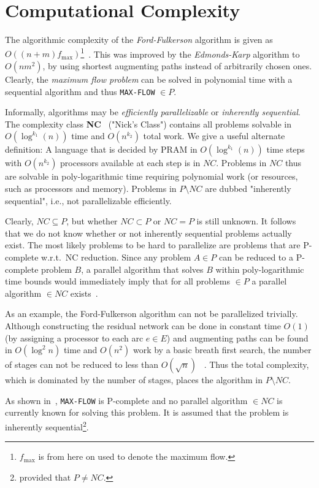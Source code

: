 \documentclass[a4paper,10pt, twocolumn]{article}
\begin{document}
\section{Computational Complexity}
\label{sec:cc}
The algorithmic complexity of the \emph{Ford-Fulkerson} algorithm is given as $O((n+m)f_{\mathrm{max}})$\footnote{$f_{\mathrm{max}}$ is from here on used to denote the maximum flow.}~\cite{ahuja93,papa95}. This was improved by the \emph{Edmonds-Karp} algorithm to $O(nm^2)$, by using shortest augmenting paths instead of arbitrarily chosen ones. Clearly, the \emph{maximum flow problem} can be solved in polynomial time with a sequential algorithm and thus \lstinline|MAX-FLOW| $\in P$.

Informally, algorithms may be \emph{efficiently parallelizable} or \emph{inherently sequential}. The complexity class \textbf{NC}~\cite{papa95} ("Nick's Class") contains all problems solvable in $O(\log^{k_1}(n))$ time and $O(n^{k_2})$ total work. We give a useful alternate definition:  A language that is decided by PRAM in $O(\log^{k_1}(n))$ time steps with $O(n^{k_2})$ processors available at each step is in $NC$. Problems in $NC$ thus are solvable  in poly-logarithmic time requiring polynomial work (or resources, such as processors and memory). Problems in $P \setminus NC$ are dubbed "inherently sequential", i.e., not parallelizable efficiently. 

Clearly, $NC \subseteq P$, but whether $NC \subset P$ or $NC = P$ is still unknown. It follows that we do not know whether or not inherently sequential problems actually exist. The most likely problems to be hard to parallelize are problems that are P-complete w.r.t.\ NC reduction. Since any problem $A \in P$ can be reduced to a P-complete problem $B$, a parallel algorithm that solves $B$ within poly-logarithmic time bounds would immediately imply that for all problems $\in P$ a parallel algorithm $\in NC$ exists~\cite{papa95}.

As an example, the Ford-Fulkerson algorithm can not be parallelized trivially. Although constructing the residual network can be done in constant time $O(1)$ (by assigning a processor to each arc $e \in E$) and augmenting paths can be found in $O(\log^{2}n)$ time and $O(n^{2})$ work by a basic breath first search, the number of stages can not be reduced to less than $O(\sqrt{n})$ ~\cite{ahuja93}. Thus the total complexity, which is dominated by the number of stages, places the algorithm in $P \setminus NC$.
	
As shown in~\cite{papa95}, \lstinline|MAX-FLOW| is P-complete and no parallel algorithm $\in NC$ is currently known for solving this problem. It is assumed that the problem is inherently sequential\footnote{provided that $P \neq NC$.}.
\end{document}

